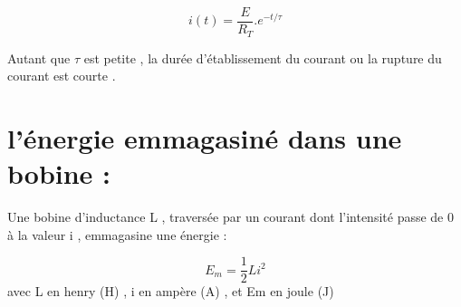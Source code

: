 \documentclass[12pt]{article}
\begin{document}
$$i(t) = \frac{E}{R_T}.e^{-t/\tau}$$

Autant que $\tau$ est petite , la durée d’établissement du courant ou la rupture du courant est courte .

\section{l'énergie emmagasiné dans une bobine :}

Une bobine d’inductance L , traversée par un courant dont l’intensité
passe de 0 à la valeur i , emmagasine une énergie :

$$E_m = \frac{1}{2}Li^2$$
avec L en henry (H) , i en ampère (A) , et Em en joule (J)
\end{document}
